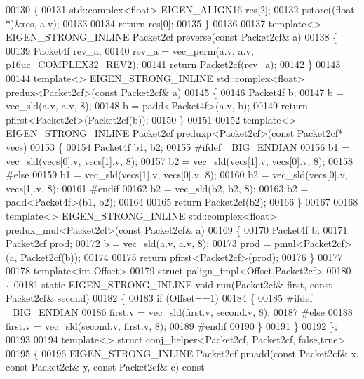 \begin{DoxyCode}
00130 \{
00131   std::complex<float> EIGEN\_ALIGN16 res[2];
00132   pstore((\textcolor{keywordtype}{float} *)&res, a.v);
00133 
00134   \textcolor{keywordflow}{return} res[0];
00135 \}
00136 
00137 \textcolor{keyword}{template}<> EIGEN\_STRONG\_INLINE Packet2cf preverse(\textcolor{keyword}{const} Packet2cf& a)
00138 \{
00139   Packet4f rev\_a;
00140   rev\_a = vec\_perm(a.v, a.v, p16uc\_COMPLEX32\_REV2);
00141   \textcolor{keywordflow}{return} Packet2cf(rev\_a);
00142 \}
00143 
00144 \textcolor{keyword}{template}<> EIGEN\_STRONG\_INLINE std::complex<float> predux<Packet2cf>(\textcolor{keyword}{const} Packet2cf& a)
00145 \{
00146   Packet4f b;
00147   b = vec\_sld(a.v, a.v, 8);
00148   b = padd<Packet4f>(a.v, b);
00149   \textcolor{keywordflow}{return} pfirst<Packet2cf>(Packet2cf(b));
00150 \}
00151 
00152 \textcolor{keyword}{template}<> EIGEN\_STRONG\_INLINE Packet2cf preduxp<Packet2cf>(\textcolor{keyword}{const} Packet2cf* vecs)
00153 \{
00154   Packet4f b1, b2;
00155 \textcolor{preprocessor}{#ifdef \_BIG\_ENDIAN  }
00156   b1 = vec\_sld(vecs[0].v, vecs[1].v, 8);
00157   b2 = vec\_sld(vecs[1].v, vecs[0].v, 8);
00158 \textcolor{preprocessor}{#else}
00159   b1 = vec\_sld(vecs[1].v, vecs[0].v, 8);
00160   b2 = vec\_sld(vecs[0].v, vecs[1].v, 8);
00161 \textcolor{preprocessor}{#endif}
00162   b2 = vec\_sld(b2, b2, 8);
00163   b2 = padd<Packet4f>(b1, b2);
00164 
00165   \textcolor{keywordflow}{return} Packet2cf(b2);
00166 \}
00167 
00168 \textcolor{keyword}{template}<> EIGEN\_STRONG\_INLINE std::complex<float> predux\_mul<Packet2cf>(\textcolor{keyword}{const} Packet2cf& a)
00169 \{
00170   Packet4f b;
00171   Packet2cf prod;
00172   b = vec\_sld(a.v, a.v, 8);
00173   prod = pmul<Packet2cf>(a, Packet2cf(b));
00174 
00175   \textcolor{keywordflow}{return} pfirst<Packet2cf>(prod);
00176 \}
00177 
00178 \textcolor{keyword}{template}<\textcolor{keywordtype}{int} Offset>
00179 \textcolor{keyword}{struct }palign\_impl<Offset,Packet2cf>
00180 \{
00181   \textcolor{keyword}{static} EIGEN\_STRONG\_INLINE \textcolor{keywordtype}{void} run(Packet2cf& first, \textcolor{keyword}{const} Packet2cf& second)
00182   \{
00183     \textcolor{keywordflow}{if} (Offset==1)
00184     \{
00185 \textcolor{preprocessor}{#ifdef \_BIG\_ENDIAN}
00186       first.v = vec\_sld(first.v, second.v, 8);
00187 \textcolor{preprocessor}{#else}
00188       first.v = vec\_sld(second.v, first.v, 8);
00189 \textcolor{preprocessor}{#endif}
00190     \}
00191   \}
00192 \};
00193 
00194 \textcolor{keyword}{template}<> \textcolor{keyword}{struct }conj\_helper<Packet2cf, Packet2cf, false,true>
00195 \{
00196   EIGEN\_STRONG\_INLINE Packet2cf pmadd(\textcolor{keyword}{const} Packet2cf& x, \textcolor{keyword}{const} Packet2cf& y, \textcolor{keyword}{const} Packet2cf& c)\textcolor{keyword}{ const}

\end{DoxyCode}
